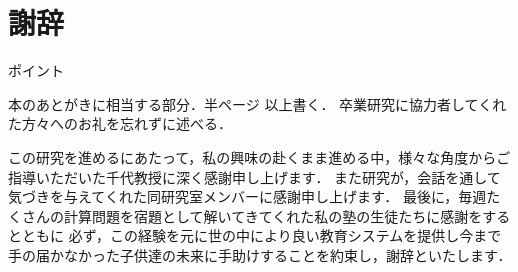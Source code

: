 \documentclass[a4j,11pt,report]{jsbook}
\newcommand{\point}[1]{
\begin{itembox}[l]{ポイント}
  #1
\end{itembox}
}
\begin{document}
\chapter*{謝辞 \label{ch:acknowledgement}}
\thispagestyle{empty}
\if
\point{
本のあとがきに相当する部分．半ページ 以上書く．
卒業研究に協力者してくれた方々へのお礼を忘れずに述べる．
}
\fi
この研究を進めるにあたって，私の興味の赴くまま進める中，様々な角度からご指導いただいた千代教授に深く感謝申し上げます．
また研究が，会話を通して気づきを与えてくれた同研究室メンバーに感謝申し上げます．
最後に，毎週たくさんの計算問題を宿題として解いてきてくれた私の塾の生徒たちに感謝をするとともに
必ず，この経験を元に世の中により良い教育システムを提供し今まで手の届かなかった子供達の未来に手助けすることを約束し，謝辞といたします．



\end{document}
